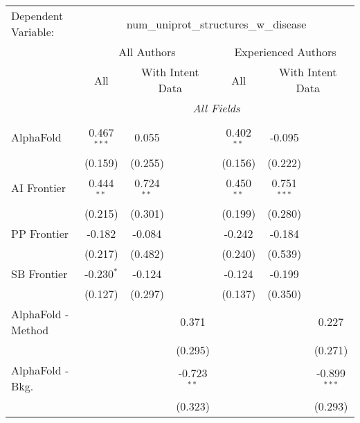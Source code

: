 \begingroup
\centering
\begin{tabular}{lcccccc}
   \tabularnewline \midrule \midrule
   Dependent Variable: & \multicolumn{6}{c}{num\_uniprot\_structures\_w\_disease}\\
 & \multicolumn{3}{c}{All Authors} & \multicolumn{3}{c}{Experienced Authors} \\
\cmidrule(lr){2-4} \cmidrule(lr){5-7}
 & \multicolumn{1}{c}{All} & \multicolumn{2}{c}{With Intent Data} & \multicolumn{1}{c}{All} & \multicolumn{2}{c}{With Intent Data} \\
\cmidrule(lr){2-2} \cmidrule(lr){3-4} \cmidrule(lr){5-5} \cmidrule(lr){6-7}
 & \multicolumn{6}{c}{\textit{All Fields}} \\ \\
   AlphaFold            & 0.467$^{***}$ & 0.055        &                & 0.402$^{**}$ & -0.095        &   \\   
                        & (0.159)       & (0.255)      &                & (0.156)      & (0.222)       &   \\   
   AI Frontier          & 0.444$^{**}$  & 0.724$^{**}$ &                & 0.450$^{**}$ & 0.751$^{***}$ &   \\   
                        & (0.215)       & (0.301)      &                & (0.199)      & (0.280)       &   \\   
   PP Frontier          & -0.182        & -0.084       &                & -0.242       & -0.184        &   \\   
                        & (0.217)       & (0.482)      &                & (0.240)      & (0.539)       &   \\   
   SB Frontier          & -0.230$^{*}$  & -0.124       &                & -0.124       & -0.199        &   \\   
                        & (0.127)       & (0.297)      &                & (0.137)      & (0.350)       &   \\   
   AlphaFold - Method   &               &              & 0.371          &              &               & 0.227\\   
                        &               &              & (0.295)        &              &               & (0.271)\\   
   AlphaFold - Bkg.     &               &              & -0.723$^{**}$  &              &               & -0.899$^{***}$\\   
                        &               &              & (0.323)        &              &               & (0.293)\\   

\end{tabular}
